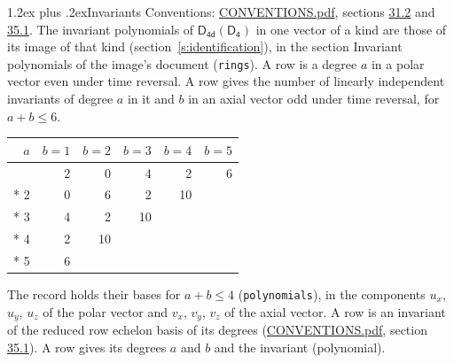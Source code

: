 \documentclass[10pt,a4paper]{article}
\makeatletter
\renewcommand\section{\@startsection{section}{1}{\z@}{-3ex plus -1ex minus -.2ex}%
  {1.2ex plus .2ex}{\normalfont\large\sffamily\bfseries\color{parttitle}}}
\numberwithin{equation}{section}
\newcommand{\grp}[1]{\mathsf{#1}}
\makeatother
\begin{document}
\section{Invariants}\label{s:invariants}
Conventions: \href{../../CONVENTIONS.pdf}{CONVENTIONS.pdf}, sections \href{../../CONVENTIONS.pdf\#conv.31.2}{31.2} and \href{../../CONVENTIONS.pdf\#conv.35.1}{35.1}.
The invariant polynomials of $\grp{D_{4d}}(\grp{D_{4}})$ in one vector of a kind are those of its image of that kind (section~\ref{s:identification}), in the section Invariant polynomials of the image's document (\texttt{rings}).
\leavevmode\label{n:index.degree.polar}\label{n:index.degree.axial}A row is a degree $a$ in a polar vector even under time reversal. A row gives the number of linearly independent invariants of degree $a$ in it and $b$ in an axial vector odd under time reversal, for $a + b \le 6$.
{\small\begin{longtable}{@{}rrrrrr@{}}\toprule
$a$ & $b = 1$ & $b = 2$ & $b = 3$ & $b = 4$ & $b = 5$\\\midrule\endhead
\bottomrule\endfoot\endlastfoot
1 & 2 & 0 & 4 & 2 & 6\\*
2 & 0 & 6 & 2 & 10 & \\*
3 & 4 & 2 & 10 &  & \\*
4 & 2 & 10 &  &  & \\*
5 & 6 &  &  &  & \\
\bottomrule\end{longtable}}
\leavevmode\label{n:local.component.polar}\label{n:local.component.axial}The record holds their bases for $a + b \le 4$ (\texttt{polynomials}), in the components $u_{x}$, $u_{y}$, $u_{z}$ of the polar vector and $v_{x}$, $v_{y}$, $v_{z}$ of the axial vector. \label{n:head.polynomial}A row is an invariant of the reduced row echelon basis of its degrees (\href{../../CONVENTIONS.pdf}{CONVENTIONS.pdf}, section \href{../../CONVENTIONS.pdf\#conv.35.1}{35.1}). A row gives its degrees $a$ and $b$ and the invariant (polynomial).
\end{document}
